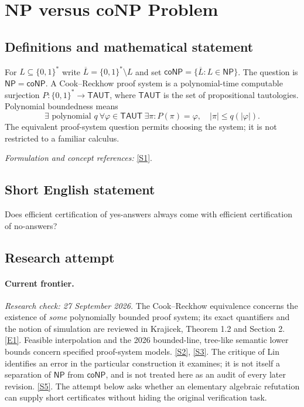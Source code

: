 \documentclass[11pt,a4paper]{article}
\newcommand{\sref}[2]{\hyperlink{source:#1:#2}{[S#2]}}
\newcommand{\eref}[2]{\hyperlink{extra:#1:#2}{[E#2]}}
\newif\ifshowcatalogue
\newcommand{\cataloguescope}[1]{\ifshowcatalogue
 \paragraph{Exact scope in the supplied catalogue.}
 \begin{quote}\small #1\end{quote}\fi}
\begin{document}
\setcounter{section}{0}
\clearpage
\section*{\texorpdfstring{NP versus coNP Problem}{NP versus coNP Problem}}\label{30006679}
\subsection{Definitions and mathematical statement}
For $L\subseteq\{0,1\}^*$ write $\overline L=\{0,1\}^*\setminus L$ and set $\mathsf{coNP}=\{\overline L:L\in\mathsf{NP}\}$. The question is $\mathsf{NP}=\mathsf{coNP}$. A Cook--Reckhow proof system is a polynomial-time computable surjection $P:\{0,1\}^*\to\mathsf{TAUT}$, where $\mathsf{TAUT}$ is the set of propositional tautologies. Polynomial boundedness means
\[
 \exists\text{ polynomial }q\ \forall\varphi\in\mathsf{TAUT}\ \exists\pi:
 P(\pi)=\varphi,\quad|\pi|\le q(|\varphi|).
\]
The equivalent proof-system question permits choosing the system; it is not restricted to a familiar calculus.
\par\smallskip\textit{Formulation and concept references:} \sref{30006679}{1}.
\cataloguescope{Determine whether NP = coNP, that is, whether the class NP is closed under complementation. Equivalently, by the Cook-Reckhow criterion, decide whether there exists a polynomially bounded propositional proof system.}
\subsection{Short English statement}
Does efficient certification of yes-answers always come with efficient certification of no-answers?
\subsection{Research attempt}
\paragraph{Current frontier.}
\textit{Research check: 27 September 2026.}
The Cook--Reckhow equivalence concerns the existence of \emph{some}
polynomially bounded proof system; its exact quantifiers and the notion
of simulation are reviewed in Krajicek, Theorem 1.2 and Section 2.
\eref{30006679}{1}. Feasible interpolation and the 2026 bounded-line,
tree-like semantic lower bounds concern specified proof-system models.
\sref{30006679}{2}, \sref{30006679}{3}. The critique of Lin identifies an error in
the particular construction it examines; it is not itself a separation
of $\mathsf{NP}$ from $\mathsf{coNP}$, and is not treated here as an
audit of every later revision. \sref{30006679}{5}.
The attempt below asks whether an elementary algebraic refutation can
supply short certificates without hiding the original verification task.
\end{document}
